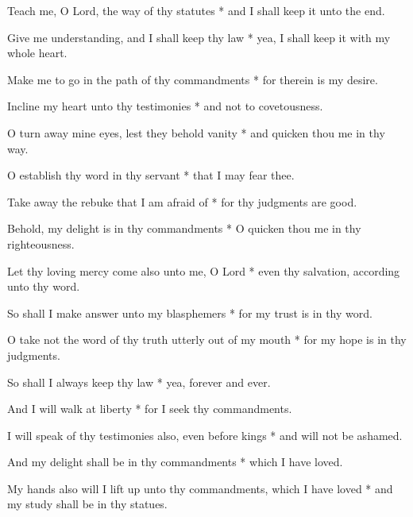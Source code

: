 Teach me, O Lord, the way of thy statutes * and I shall keep it unto the end.

Give me understanding, and I shall keep thy law * yea, I shall keep it with my whole heart.

Make me to go in the path of thy commandments * for therein is my desire.

Incline my heart unto thy testimonies * and not to covetousness.

O turn away mine eyes, lest they behold vanity * and quicken thou me in thy way.

O establish thy word in thy servant * that I may fear thee.

Take away the rebuke that I am afraid of * for thy judgments are good.

Behold, my delight is in thy commandments * O quicken thou me in thy righteousness.

Let thy loving mercy come also unto me, O Lord * even thy salvation, according unto thy word.

So shall I make answer unto my blasphemers * for my trust is in thy word.

O take not the word of thy truth utterly out of my mouth * for my hope is in thy judgments.

So shall I always keep thy law * yea, forever and ever.

And I will walk at liberty * for I seek thy commandments.

I will speak of thy testimonies also, even before kings * and will not be ashamed.

And my delight shall be in thy commandments * which I have loved.

My hands also will I lift up unto thy commandments, which I have loved * and my study shall be in thy statues.